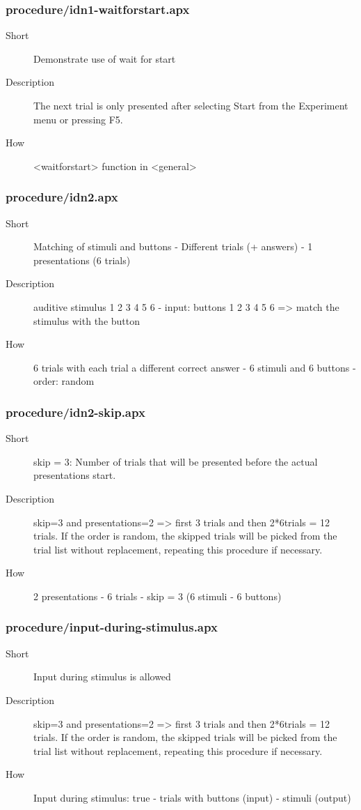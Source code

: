 \subsubsection{procedure/idn1-waitforstart.apx}
\begin{description}
\item[Short] 
 Demonstrate use of wait for start
\item[Description] 
 The next trial is only presented after selecting Start from the Experiment menu or pressing F5.
\item[How] 
 \textless{}waitforstart\textgreater{} function in \textless{}general\textgreater{}
\end{description}

\subsubsection{procedure/idn2.apx}
\begin{description}
\item[Short] 
 Matching of stimuli and buttons - Different trials (+ answers) - 1 presentations (6 trials)
\item[Description] 
 auditive stimulus 1 2 3 4 5 6 - input: buttons 1 2 3 4 5 6 =\textgreater{} match the stimulus with the button
\item[How] 
 6 trials with each trial a different correct answer - 6 stimuli and 6 buttons - order: random
\end{description}

\subsubsection{procedure/idn2-skip.apx}
\begin{description}
\item[Short] 
 skip = 3: Number of trials that will be presented before the actual presentations start.
\item[Description] 
 skip=3 and presentations=2 =\textgreater{} first 3 trials and then 2*6trials = 12 trials. If the order is random, the skipped trials will be picked from the trial list without replacement, repeating this procedure if necessary.
\item[How] 
 2 presentations - 6 trials - skip = 3 (6 stimuli - 6 buttons)
\end{description}

\subsubsection{procedure/input-during-stimulus.apx}
\begin{description}
\item[Short] 
 Input during stimulus is allowed
\item[Description] 
 skip=3 and presentations=2 =\textgreater{} first 3 trials and then 2*6trials = 12 trials. If the order is random, the skipped trials will be picked from the trial list without replacement, repeating this procedure if necessary.
\item[How] 
 Input during stimulus: true - trials with buttons (input) - stimuli (output)
\end{description}

